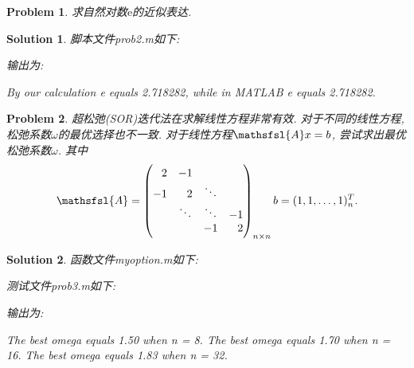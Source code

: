 \documentclass[a4paper, 12pt]{ctexart}
\let\oldlstinputlisting
\renewcommand{}[2][\empty]{
    \par\nolinenumbers\oldlstinputlisting[#1]{#2}\linenumbers\par
}
\let\oldlstlisting\lstlisting
\let\oldendlstlisting\endlstlisting
\renewenvironment{lstlisting}
    {\par\nolinenumbers\oldlstlisting}
    {\oldendlstlisting\endnolinenumbers\par}
\theoremstyle{plain}
\newtheorem{problem}{Problem}[section]
\theoremstyle{plain}
\theoremstyle{plain}
\theoremstyle{nonumberplain}
\newtheorem{solution}{Solution}
\newcommand*{\matr}[1]{\ensuremath{\mathsfsl{#1}}} %
\newcommand*{\me}{\mathrm{e}}
\begin{document}
    \begin{problem}
        求自然对数$\me$的近似表达.
    \end{problem}

    \begin{solution}
        脚本文件prob2.m如下:

        

        输出为:
        
        \begin{lstlisting}[
            caption=prob2.m输出,
            style=MATLAB-editor,
            basicstyle=\mlttfamily\scriptsize,
            numberstyle={\color{black!33}\scriptsize\sffamily}
        ]
        By our calculation e equals 2.718282, while in MATLAB e equals 2.718282.
        \end{lstlisting}
    \end{solution}

    \begin{problem}
        超松弛(SOR)迭代法在求解线性方程非常有效. 对于不同的线性方程, 松弛系数$\omega$的最优选择也不一致. 对于线性方程$\matr{A}x=b$, 尝试求出最优松弛系数$\omega$. 其中
        \begin{equation}
            \matr{A} =
            \begin{pmatrix}
                \phantom{-}2 & -1\\
                -1 & \phantom{-}2 & \ddots\\
                & \ddots & \ddots & -1\\
                & & -1 & \phantom{-}2
            \end{pmatrix}_{n\times n}\\
            b = (1, 1, \dotsc, 1)_{n}^{T}.
        \end{equation}
    \end{problem}

    \begin{solution}
        函数文件myoption.m如下:

        

        测试文件prob3.m如下:

        

        输出为:

        \begin{lstlisting}[
            caption=prob3.m输出,
            style=MATLAB-editor,
            basicstyle=\mlttfamily\scriptsize,
            numberstyle={\color{black!33}\scriptsize\sffamily}
        ]
The best omega equals 1.50 when n = 8.
The best omega equals 1.70 when n = 16.
The best omega equals 1.83 when n = 32.
        \end{lstlisting}
    \end{solution}
\end{document}
